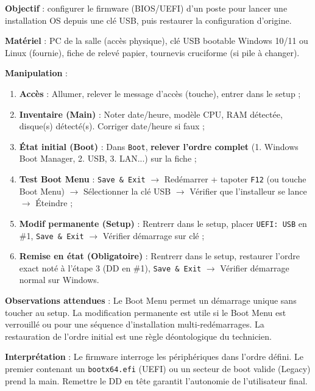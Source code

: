 \documentclass[11pt]{article}
\begin{document}
\begin{experience}
\textbf{Objectif} : configurer le firmware (BIOS/UEFI) d'un poste pour lancer une installation OS depuis une clé USB, puis restaurer la configuration d'origine.

\textbf{Matériel} : PC de la salle (accès physique), clé USB bootable Windows 10/11 ou Linux (fournie), fiche de relevé papier, tournevis cruciforme (si pile à changer).

\textbf{Manipulation} :
\begin{enumerate}
  \item \textbf{Accès} : Allumer, relever le message d'accès (touche), entrer dans le setup ;
  \item \textbf{Inventaire (Main)} : Noter date/heure, modèle CPU, RAM détectée, disque(s) détecté(s). Corriger date/heure si faux ;
  \item \textbf{État initial (Boot)} : Dans \texttt{Boot}, \textbf{relever l'ordre complet} (1. Windows Boot Manager, 2. USB, 3. LAN...) sur la fiche ;
  \item \textbf{Test Boot Menu} : \texttt{Save \& Exit} $\to$ Redémarrer + tapoter \texttt{F12} (ou touche Boot Menu) $\to$ Sélectionner la clé USB $\to$ Vérifier que l'installeur se lance $\to$ Éteindre ;
  \item \textbf{Modif permanente (Setup)} : Rentrerr dans le setup, placer \texttt{UEFI: USB} en \#1, \texttt{Save \& Exit} $\to$ Vérifier démarrage sur clé ;
  \item \textbf{Remise en état (Obligatoire)} : Rentrerr dans le setup, restaurer l'ordre exact noté à l'étape 3 (DD en \#1), \texttt{Save \& Exit} $\to$ Vérifier démarrage normal sur Windows.
\end{enumerate}

\textbf{Observations attendues} : Le Boot Menu permet un démarrage unique sans toucher au setup. La modification permanente est utile si le Boot Menu est verrouillé ou pour une séquence d'installation multi-redémarrages. La restauration de l'ordre initial est une règle déontologique du technicien.

\textbf{Interprétation} : Le firmware interroge les périphériques dans l'ordre défini. Le premier contenant un \texttt{bootx64.efi} (UEFI) ou un secteur de boot valide (Legacy) prend la main. Remettre le DD en tête garantit l'autonomie de l'utilisateur final.
\end{experience}
\end{document}
